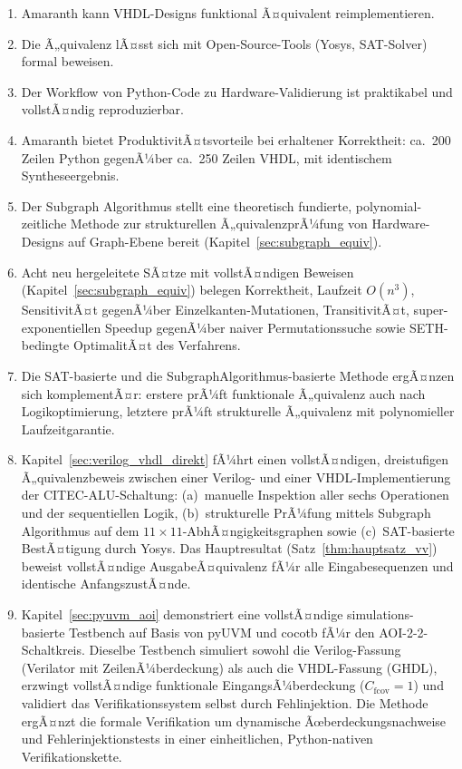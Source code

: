 ﻿\documentclass[12pt,a4paper]{report}
\begin{document}
\begin{enumerate}
    \item Amaranth kann VHDL-Designs funktional Ã¤quivalent reimplementieren.
    \item Die Ã„quivalenz lÃ¤sst sich mit Open-Source-Tools (Yosys, SAT-Solver) formal beweisen.
    \item Der Workflow von Python-Code zu Hardware-Validierung ist praktikabel und vollstÃ¤n\-dig reproduzierbar.
    \item Amaranth bietet ProduktivitÃ¤tsvorteile bei erhaltener Korrektheit: ca.~200 Zeilen Python gegenÃ¼ber ca.~250 Zeilen VHDL, mit identischem Syntheseergebnis.
    \item Der Subgraph Algorithmus \cite{subgraph2026} stellt eine theoretisch fundierte,
          polynomial-zeitliche Methode zur strukturellen Ã„quivalenzprÃ¼fung von
          Hardware-Designs auf Graph-Ebene bereit (Kapitel~\ref{sec:subgraph_equiv}).
    \item Acht neu hergeleitete SÃ¤tze mit vollstÃ¤ndigen Beweisen (Kapitel~\ref{sec:subgraph_equiv}) belegen
          Korrektheit, Laufzeit $O(n^3)$, SensitivitÃ¤t gegenÃ¼ber Einzelkanten-Mutationen,
          TransitivitÃ¤t, super-exponentiellen Speedup gegenÃ¼ber naiver Permutationssuche
          sowie SETH-bedingte OptimalitÃ¤t des Verfahrens.
    \item Die SAT-basierte und die Subgraph\-Algorithmus-basierte Me\-tho\-de ergÃ¤nzen sich
          komplementÃ¤r: erstere prÃ¼ft funktionale Ã„quivalenz auch nach Logikoptimierung,
          letztere prÃ¼ft strukturelle Ã„quivalenz mit polynomieller Laufzeitgarantie.
    \item Kapitel~\ref{sec:verilog_vhdl_direkt} fÃ¼hrt einen vollstÃ¤ndigen, dreistufigen Ã„quivalenzbeweis
          zwischen einer Verilog- und einer VHDL-Implementierung der CITEC-ALU-Schaltung:
          (a)~manuelle Inspektion aller sechs Operationen und der sequentiellen Logik,
          (b)~strukturelle PrÃ¼fung mittels Subgraph Algorithmus auf dem
          $11 \times 11$-AbhÃ¤ngigkeitsgraphen sowie
          (c)~SAT-basierte BestÃ¤tigung durch Yosys.  Das Hauptresultat
          (Satz~\ref{thm:hauptsatz_vv}) beweist vollstÃ¤ndige AusgabeÃ¤quivalenz
          fÃ¼r alle Eingabesequenzen und identische AnfangszustÃ¤nde.
    \item Kapitel~\ref{sec:pyuvm_aoi} demonstriert eine vollstÃ¤ndige simulations-basierte
          Testbench auf Basis von pyUVM \cite{pyuvm2024} und cocotb \cite{cocotb2024} fÃ¼r
          den AOI-2-2-Schaltkreis. Dieselbe Testbench simuliert sowohl die Verilog-Fassung
          (Verilator mit ZeilenÃ¼berdeckung) als auch die VHDL-Fassung (GHDL), erzwingt
          vollstÃ¤ndige funktionale EingangsÃ¼berdeckung ($C_{\mathrm{fcov}} = 1$) und
          validiert das Verifikationssystem selbst durch Fehlinjektion. Die Methode ergÃ¤nzt
          die formale Verifikation um dynamische Ãœberdeckungs\-nachweise und Fehlerinjektionstests
          in einer einheitlichen, Python-nativen Verifikationskette.
\end{enumerate}
\end{document}
